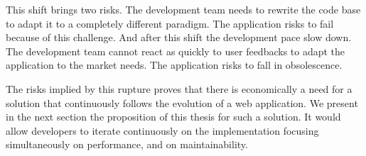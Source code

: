 

This shift brings two risks.
The development team needs to rewrite the code base to adapt it to a completely different paradigm.
The application risks to fail because of this challenge.
And after this shift the development pace slow down.
The development team cannot react as quickly to user feedbacks to adapt the application to the market needs.
The application risks to fall in obsolescence.



The risks implied by this rupture proves that there is economically a need for a solution that continuously follows the evolution of a web application.
We present in the next section the proposition of this thesis for such a solution.
It would allow developers to iterate continuously on the implementation focusing simultaneously on performance, and on maintainability.



\endinput









